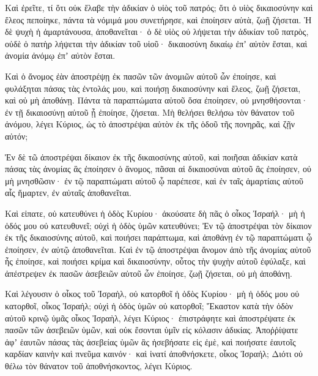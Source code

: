 {\par }{\PP {}Καὶ ἐρεῖτε, τί ὅτι οὐκ ἔλαβε τὴν ἀδικίαν ὁ υἱὸς τοῦ πατρός; ὅτι ὁ υἱὸς δικαιοσύνην καὶ ἔλεος πεποίηκε, πάντα τὰ νόμιμά μου συνετήρησε, καὶ ἐποίησεν αὐτὰ, ζωῇ ζήσεται.
Ἡ δὲ ψυχὴ ἡ ἁμαρτάνουσα, ἀποθανεῖται· ὁ δὲ υἱὸς οὐ λήψεται τὴν ἀδικίαν τοῦ πατρὸς, οὐδὲ ὁ πατὴρ λήψεται τὴν ἀδικίαν τοῦ υἱοῦ· δικαιοσύνη δικαίῳ ἐπʼ αὐτὸν ἔσται, καὶ ἀνομία ἀνόμῳ ἐπʼ αὐτὸν ἔσται.
\par }{\PP {}Καὶ ὁ ἄνομος ἐὰν ἀποστρέψῃ ἐκ πασῶν τῶν ἀνομιῶν αὐτοῦ ὧν ἐποίησε, καὶ φυλάξηται πάσας τὰς ἐντολάς μου, καὶ ποιήσῃ δικαιοσύνην καὶ ἔλεος, ζωῇ ζήσεται, καὶ οὐ μὴ ἀποθάνῃ.
Πάντα τὰ παραπτώματα αὐτοῦ ὅσα ἐποίησεν, οὐ μνησθήσονται· ἐν τῇ δικαιοσύνῃ αὐτοῦ ᾗ ἐποίησε, ζήσεται.
Μὴ θελήσει θελήσω τὸν θάνατον τοῦ ἀνόμου, λέγει Κύριος, ὡς τὸ ἀποστρέψαι αὐτὸν ἐκ τῆς ὁδοῦ τῆς πονηρᾶς, καὶ ζῇν αὐτόν;
\par }{\PP {}Ἐν δὲ τῶ ἀποστρέψαι δίκαιον ἐκ τῆς δικαιοσύνης αὐτοῦ, καὶ ποιῆσαι ἀδικίαν κατὰ πάσας τὰς ἀνομίας ἃς ἐποίησεν ὁ ἄνομος, πᾶσαι αἱ δικαιοσύναι αὐτοῦ ἃς ἐποίησεν, οὐ μὴ μνησθῶσιν· ἐν τῷ παραπτώματι αὐτοῦ ᾧ παρέπεσε, καὶ ἐν ταῖς ἁμαρτίαις αὐτοῦ αἷς ἥμαρτεν, ἐν αὐταῖς ἀποθανεῖται.
\par }{\PP {}Καὶ εἰπατε, οὐ κατευθύνει ἡ ὁδὸς Κυρίου· ἀκούσατε δὴ πᾶς ὁ οἶκος Ἰσραήλ· μὴ ἡ ὁδός μου οὐ κατευθυνεῖ; οὐχὶ ἡ ὁδὸς ὑμῶν κατευθύνει;
Ἐν τῷ ἀποστρέψαι τὸν δίκαιον ἐκ τῆς δικαιοσύνης αὐτοῦ, καὶ ποιήσει παράπτωμα, καὶ ἀποθάνῃ ἐν τῷ παραπτώματι ᾧ ἐποίησεν, ἐν αὐτῷ ἀποθανεῖται.
Καὶ ἐν τῷ ἀποστρέψαι ἄνομον ἀπὸ τῆς ἀνομίας αὐτοῦ ἧς ἐποίησε, καὶ ποιήσει κρίμα καὶ δικαιοσύνην, οὗτος τὴν ψυχὴν αὐτοῦ ἐφύλαξε,
καὶ ἀπέστρεψεν ἐκ πασῶν ἀσεβειῶν αὐτοῦ ὧν ἐποίησε, ζωῇ ζήσεται, οὐ μὴ ἀποθάνῃ.
\par }{\PP {}Καὶ λέγουσιν ὁ οἶκος τοῦ Ἰσραὴλ, οὐ κατορθοῖ ἡ ὁδὸς Κυρίου· μὴ ἡ ὁδός μου οὐ κατορθοῖ, οἶκος Ἰσραήλ; οὐχὶ ἡ ὁδὸς ὑμῶν οὐ κατορθοῖ;
Ἕκαστον κατὰ τὴν ὁδὸν αὐτοῦ κρινῷ ὑμᾶς οἶκος Ἰσραὴλ, λέγει Κύριος· ἐπιστράφητε καὶ ἀποστρέψατε ἐκ πασῶν τῶν ἀσεβειῶν ὑμῶν, καὶ οὐκ ἔσονται ὑμῖν εἰς κόλασιν ἀδικίας.
Ἀποῤῥίψατε ἀφʼ ἑαυτῶν πάσας τὰς ἀσεβείας ὑμῶν ἃς ἠσεβήσατε εἰς ἐμὲ, καὶ ποιήσατε ἑαυτοῖς καρδίαν καινὴν καὶ πνεῦμα καινόν· καὶ ἱνατί ἀποθνήσκετε, οἶκος Ἰσραήλ;
Διότι οὐ θέλω τὸν θάνατον τοῦ ἀποθνήσκοντος, λέγει Κύριος.

}
